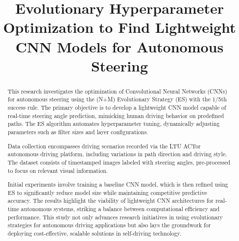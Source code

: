 \documentclass[conference]{IEEEtran}
\begin{document}
\title{Evolutionary Hyperparameter Optimization to Find Lightweight CNN Models for Autonomous Steering}

\author{
    \and
    \and
}

\maketitle

\begin{abstract}
    This research investigates the optimization of Convolutional Neural Networks (CNNs) for autonomous steering using the (N+M) Evolutionary Strategy (ES) with the 1/5th success rule. The primary objective is to develop a lightweight CNN model capable of real-time steering angle prediction, mimicking human driving behavior on predefined paths. The ES algorithm automates hyperparameter tuning, dynamically adjusting parameters such as filter sizes and layer configurations.

    Data collection encompasses driving scenarios recorded via the LTU ACTor autonomous driving platform, including variations in path direction and driving style. The dataset consists of timestamped images labeled with steering angles, pre-processed to focus on relevant visual information.

    Initial experiments involve training a baseline CNN model, which is then refined using ES to significantly reduce model size while maintaining competitive predictive accuracy. The results highlight the viability of lightweight CNN architectures for real-time autonomous systems, striking a balance between computational efficiency and performance. This study not only advances research initiatives in using evolutionary strategies for autonomous driving applications but also lays the groundwork for deploying cost-effective, scalable solutions in self-driving technology.
\end{abstract}
\end{document}
